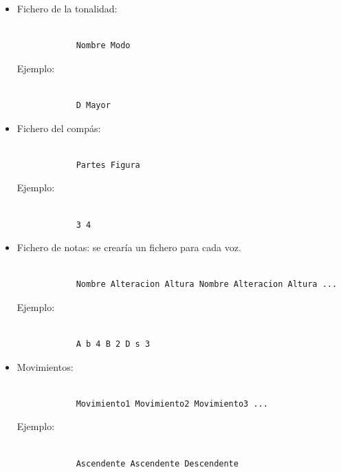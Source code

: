 \begin{itemize}

	\item Fichero de la tonalidad:

		\begin{lstlisting}[frame=single]

			Nombre Modo

		\end{lstlisting}

		Ejemplo:

		\begin{lstlisting}[frame=single]

			D Mayor

		\end{lstlisting} 

	\bigskip
	\item Fichero del compás:

		\begin{lstlisting}[frame=single]

			Partes Figura

		\end{lstlisting}

		Ejemplo:

		\begin{lstlisting}[frame=single]

			3 4

		\end{lstlisting} 

	\bigskip
	\item Fichero de notas: se crearía un fichero para cada voz.
	
		\begin{lstlisting}[frame=single]

			Nombre Alteracion Altura Nombre Alteracion Altura ...

		\end{lstlisting} 

		Ejemplo:

		\begin{lstlisting}[frame=single]

			A b 4 B 2 D s 3

		\end{lstlisting} 

	\bigskip
	\item Movimientos:

		\begin{lstlisting}[frame=single]

			Movimiento1 Movimiento2 Movimiento3 ...

		\end{lstlisting} 

		Ejemplo:

		\begin{lstlisting}[frame=single]

			Ascendente Ascendente Descendente

		\end{lstlisting} 

\end{itemize}

